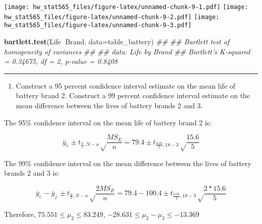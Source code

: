 \documentclass[]{article}
\newenvironment{Shaded}{\begin{snugshade}}{\end{snugshade}}
\newcommand{\CommentTok}[1]{\textcolor[rgb]{0.56,0.35,0.01}{\textit{#1}}}
\newcommand{\DataTypeTok}[1]{\textcolor[rgb]{0.13,0.29,0.53}{#1}}
\newcommand{\KeywordTok}[1]{\textcolor[rgb]{0.13,0.29,0.53}{\textbf{#1}}}
\newcommand{\NormalTok}[1]{#1}
\newcommand{\OperatorTok}[1]{\textcolor[rgb]{0.81,0.36,0.00}{\textbf{#1}}}
\providecommand{\tightlist}{%
  \setlength{\itemsep}{0pt}\setlength{\parskip}{0pt}}
\begin{document}
\texttt{[image: hw\_stat565\_files/figure-latex/unnamed-chunk-9-1.pdf]}
\texttt{[image: hw\_stat565\_files/figure-latex/unnamed-chunk-9-2.pdf]}
\texttt{[image: hw\_stat565\_files/figure-latex/unnamed-chunk-9-3.pdf]}

\begin{Shaded}
\begin{Highlighting}[]
\KeywordTok{bartlett.test}\NormalTok{(Life}\OperatorTok{~}\NormalTok{Brand, }\DataTypeTok{data=}\NormalTok{table_battery)}
\CommentTok{## }
\CommentTok{##  Bartlett test of homogeneity of variances}
\CommentTok{## }
\CommentTok{## data:  Life by Brand}
\CommentTok{## Bartlett's K-squared = 0.34675, df = 2, p-value = 0.8408}
\end{Highlighting}
\end{Shaded}

\begin{center}\rule{0.5\linewidth}{\linethickness}\end{center}

\begin{enumerate}
\def\labelenumi{(\alph{enumi})}
\setcounter{enumi}{2}
\tightlist
\item
  Construct a 95 percent confidence interval estimate on the mean life
  of battery brand 2. Construct a 99 percent confidence interval
  estimate on the mean difference between the lives of battery brands 2
  and 3.
\end{enumerate}

The 95\% confidence interval on the mean life of battery brand 2 is:

\[\bar y_{i.}\pm t_{\frac{\alpha}2,N-a}\sqrt\frac{MS_E}n=79.4\pm t_{\frac{0.05}2,18-3}\sqrt\frac{15.6}5\]

The 99\% confidence interval on the mean difference between the lives of
battery brands 2 and 3 is:

\[\bar y_{i.}-\bar y_{j.}\pm t_{\frac{\alpha}2,N-a}\sqrt\frac{2MS_E}n=79.4-100.4\pm t_{\frac{0.01}2,18-3}\sqrt\frac{2*15.6}5\]

Therefore, \(75.551\le\mu_2\le83.249\),
\(-28.631\le\mu_2-\mu_3\le-13.369\)
\end{document}
